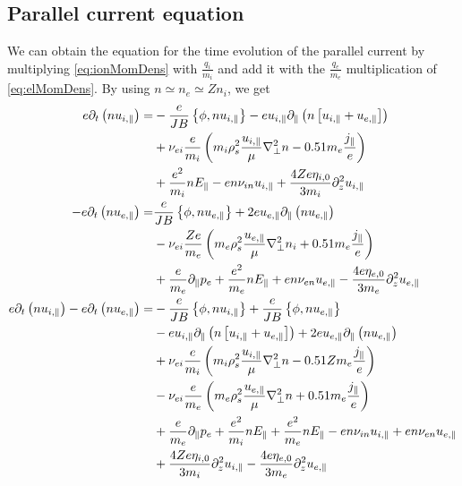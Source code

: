 \subsection{Parallel current equation}
%
We can obtain the equation for the time evolution of the parallel current by multiplying \cref{eq:ionMomDens} with $\frac{q_i}{m_i}$ and add it with the $\frac{q_e}{m_e}$ multiplication of \cref{eq:elMomDens}.
By using $n\simeq n_e \simeq Zn_i$, we get
%
%
\begin{align*}
 e \partial_t\L( n u_{i,\|}\R)
 =&
 -\frac{e}{JB}\L\{\phi, n u_{i,\|}\R\}
 -e u_{i,\|}\partial_\|\L( n \L[u_{i,\|}+ u_{e,\|} \R]\R)
   \\&
 + \nu_{ei}\frac{e}{m_i}\L(
   m_i \rho_s^2\frac{u_{i,\|}}{\mu} \grad_\perp^2 n
   -0.51  m_e \frac{j_\|}{e}
   \R)
   \\&
   +\frac{e^2}{m_i} n  E_\|
 - e n \nu_{i n}u_{i,\|}
 + \frac{4Ze\eta_{i,0}}{3m_i} \partial_z^2 u_{i,\|}
 \\
 -e \partial_t\L( n u_{e,\|}\R)
 =&
  \frac{e}{JB}\L\{\phi, n u_{e,\|}\R\}
 + 2e u_{e,\|}\partial_\|\L( n  u_{e,\|} \R)
   \\&
 - \nu_{ei}\frac{Ze}{m_e}\L(
   m_e \rho_s^2\frac{u_{e,\|}}{\mu} \grad_\perp^2 n_i
   + 0.51 m_e \frac{j_\|}{e}
   \R)
   \\&
   +\frac{e}{m_e} \partial_\| p_e
   + \frac{e^2}{m_e} n E_\|
 + en \nu_{e n}u_{e,\|}
 - \frac{4e\eta_{e,0}}{3m_e} \partial_z^2 u_{e,\|}
 \\
 e \partial_t\L( n u_{i,\|}\R)
 -e \partial_t\L( n u_{e,\|}\R)
 =&
 -\frac{e}{JB}\L\{\phi, n u_{i,\|}\R\}
 +\frac{e}{JB}\L\{\phi, n u_{e,\|}\R\}
   \\&
 -e u_{i,\|}\partial_\|\L( n \L[u_{i,\|}+ u_{e,\|} \R]\R)
 + 2e u_{e,\|}\partial_\|\L( n  u_{e,\|} \R)
   \\&
 + \nu_{ei}\frac{e}{m_i}\L(
   m_i \rho_s^2\frac{u_{i,\|}}{\mu} \grad_\perp^2 n
   - 0.51 Z m_e \frac{j_\|}{e}
   \R)
   \\&
 - \nu_{ei}\frac{e}{m_e}\L(
   m_e \rho_s^2\frac{u_{e,\|}}{\mu} \grad_\perp^2 n
   + 0.51 m_e \frac{j_\|}{e}
   \R)
   \\&
   +\frac{e}{m_e} \partial_\| p_e
   +\frac{e^2}{m_i} n  E_\|
   + \frac{e^2}{m_e}n E_\|
 - e n \nu_{i n}u_{i,\|}
 + en \nu_{e n}u_{e,\|}
   \\&
 + \frac{4Ze\eta_{i,0}}{3m_i} \partial_z^2 u_{i,\|}
 - \frac{4e\eta_{e,0}}{3m_e} \partial_z^2 u_{e,\|}

\end{align*}
